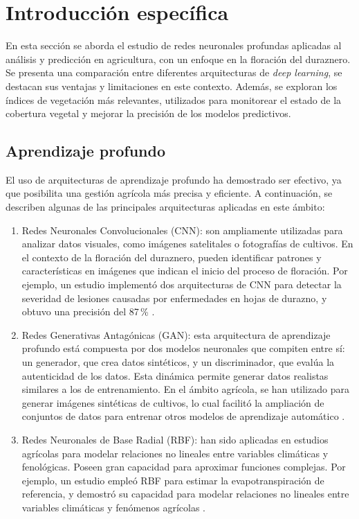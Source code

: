 \chapter{Introducción específica} %

\label{Chapter2}

En esta sección se aborda el estudio de redes neuronales profundas aplicadas al análisis y predicción en 
agricultura, con un enfoque en la floración del duraznero. Se presenta una comparación entre diferentes 
arquitecturas de \textit{deep learning}, se destacan sus ventajas y limitaciones en este contexto. Además, se 
exploran los índices de vegetación más relevantes, utilizados para monitorear el estado de la cobertura 
vegetal y mejorar la precisión de los modelos predictivos.

\section{Aprendizaje profundo}

El uso de arquitecturas de aprendizaje profundo ha demostrado ser efectivo, ya que posibilita una 
gestión agrícola más precisa y eficiente. A continuación, se describen algunas de las principales
arquitecturas aplicadas en este ámbito:


\begin{enumerate}
	\item Redes Neuronales Convolucionales (CNN): son ampliamente utilizadas para analizar datos 
	visuales, como imágenes satelitales o fotografías de cultivos. En el contexto de la floración del duraznero,
	pueden identificar patrones y características en imágenes que indican el inicio del proceso de
	floración. Por ejemplo, un estudio implementó dos arquitecturas de CNN para detectar la severidad de 
	lesiones causadas por enfermedades en hojas de durazno, y obtuvo una precisión del 87\,\% \citep{Rodriguez2023}. 
	\item Redes Generativas Antagónicas (GAN): esta arquitectura de aprendizaje profundo está compuesta 
	por dos modelos neuronales que compiten entre sí: un generador, que crea datos sintéticos, y un 
	discriminador, que evalúa la autenticidad de los datos. Esta dinámica permite generar datos 
	realistas similares a los de entrenamiento. En el ámbito agrícola, se han utilizado para generar imágenes 
	sintéticas de cultivos, lo cual facilitó la ampliación de conjuntos de datos para entrenar otros modelos de aprendizaje 
	automático \citep{Goodfellow2014}.
	\item Redes Neuronales de Base Radial (RBF): han sido aplicadas en estudios agrícolas para modelar relaciones
	 no lineales entre variables climáticas y fenológicas. Poseen gran capacidad para aproximar funciones complejas.
	 Por ejemplo, un estudio empleó RBF para estimar la evapotranspiración de referencia, y demostró su capacidad
	para modelar relaciones no lineales entre variables climáticas y fenómenos agrícolas \citep{Cerv2012}.
\end{enumerate}
	
